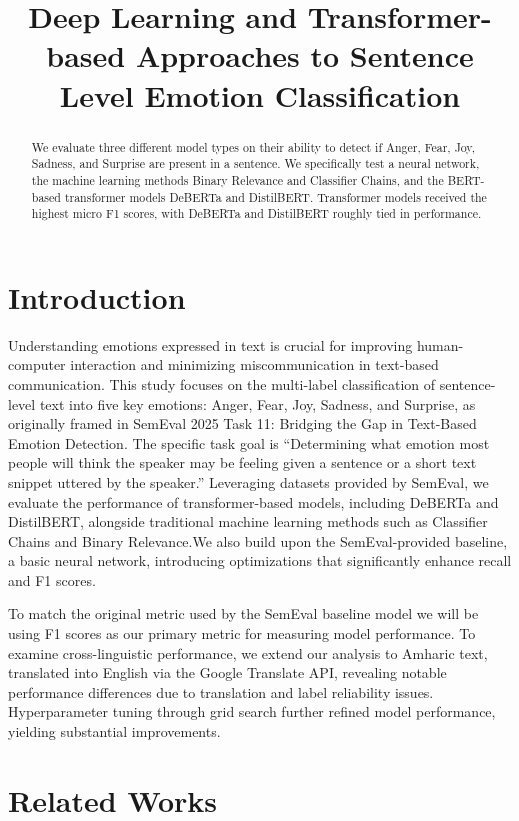 \documentclass[11pt]{article}
\title{Deep Learning and Transformer-based Approaches to Sentence Level Emotion Classification}
\begin{document}
\maketitle
\begin{abstract}
We evaluate three different model types on their ability to detect if Anger, Fear, Joy, Sadness, and Surprise are present in a sentence. We specifically test a neural network, the machine learning methods Binary Relevance and Classifier Chains, and the BERT-based transformer models DeBERTa and DistilBERT. Transformer models received the highest micro F1 scores, with DeBERTa and DistilBERT roughly tied in performance. 

\end{abstract}

\section{Introduction}

Understanding emotions expressed in text is crucial for improving human-computer interaction and minimizing miscommunication in text-based communication. This study focuses on the multi-label classification of sentence-level text into five key emotions: Anger, Fear, Joy, Sadness, and Surprise, as originally framed in SemEval 2025 Task 11: Bridging the Gap in Text-Based Emotion Detection. The specific task goal is “Determining what emotion most people will think the speaker may be feeling given a sentence or a short text snippet uttered by the speaker.” Leveraging datasets provided by SemEval, we evaluate the performance of transformer-based models, including DeBERTa and DistilBERT, alongside traditional machine learning methods such as Classifier Chains and Binary Relevance.We also build upon the SemEval-provided baseline, a basic neural network, introducing optimizations that significantly enhance recall and F1 scores. 

To match the original metric used by the SemEval baseline model we will be using F1 scores as our primary metric for measuring model performance. To examine cross-linguistic performance, we extend our analysis to Amharic text, translated into English via the Google Translate API, revealing notable performance differences due to translation and label reliability issues. Hyperparameter tuning through grid search further refined model performance, yielding substantial improvements.


\section{Related Works}
\end{document}
